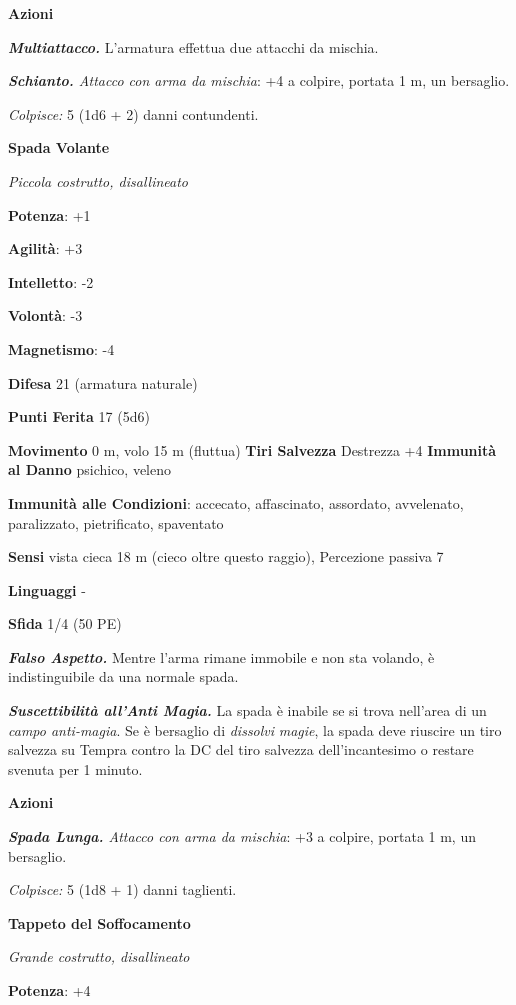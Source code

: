\begin{multicols}{2}
\smallskip\textbf{Azioni}

\emph{\textbf{Multiattacco.}} L'armatura effettua due attacchi da
mischia.

\emph{\textbf{Schianto.} Attacco con arma da mischia}: +4 a colpire,
portata 1 m, un bersaglio.

\emph{Colpisce:} 5 (1d6 + 2) danni contundenti.

\textbf{Spada Volante}

\emph{Piccola costrutto, disallineato}

\textbf{Potenza}: +1

\textbf{Agilità}: +3

\textbf{Intelletto}: -2

\textbf{Volontà}: -3

\textbf{Magnetismo}: -4

\textbf{Difesa} 21 (armatura naturale)

\textbf{Punti Ferita} 17 (5d6)

\textbf{Movimento} 0 m, volo 15 m (fluttua) \textbf{Tiri Salvezza}
Destrezza +4 \textbf{Immunità al Danno} psichico, veleno

\textbf{Immunità alle Condizioni}: accecato, affascinato, assordato,
avvelenato, paralizzato, pietrificato, spaventato

\textbf{Sensi} vista cieca 18 m (cieco oltre questo raggio), Percezione
passiva 7

\textbf{Linguaggi} -

\textbf{Sfida} 1/4 (50 PE)\smallskip

\emph{\textbf{Falso Aspetto.}} Mentre l'arma rimane immobile e non sta
volando, è indistinguibile da una normale spada.

\emph{\textbf{Suscettibilità all'Anti Magia.}} La spada è inabile se si
trova nell'area di un \emph{campo anti-magia}. Se è bersaglio di
\emph{dissolvi} \emph{magie}, la spada deve riuscire un tiro salvezza su Tempra contro la DC del tiro salvezza dell'incantesimo o restare
svenuta per 1 minuto.

\smallskip\textbf{Azioni}

\emph{\textbf{Spada Lunga.} Attacco con arma da mischia}: +3 a colpire,
portata 1 m, un bersaglio.

\emph{Colpisce:} 5 (1d8 + 1) danni taglienti.



\textbf{Tappeto del Soffocamento}

\emph{Grande costrutto, disallineato}

\textbf{Potenza}: +4


\end{multicols}

